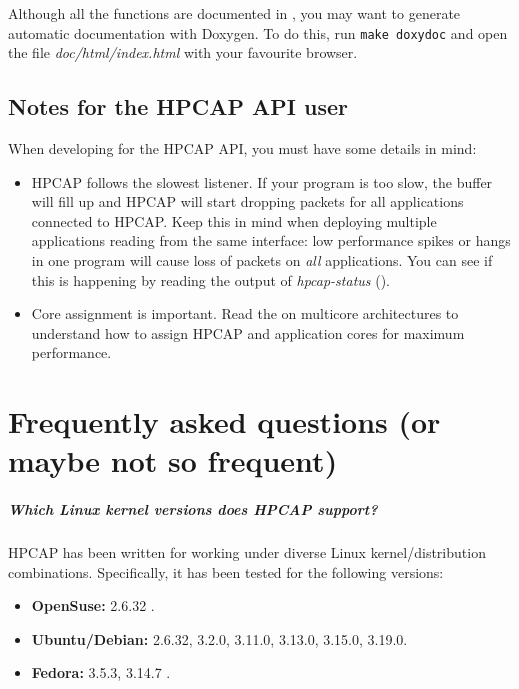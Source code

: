\documentclass[a4paper,oneside]{hpman}
\begin{document}
Although all the functions are documented in , you may want to generate automatic documentation with Doxygen. To do this, run \texttt{make doxydoc} and open the file \textit{doc/html/index.html} with your favourite browser.

\section{Notes for the HPCAP API user}

When developing for the HPCAP API, you must have some details in mind:

\begin{itemize}
\item HPCAP follows the slowest listener. If your program is too slow, the buffer will fill up and HPCAP will start dropping packets for all applications connected to HPCAP. Keep this in mind when deploying multiple applications reading from the same interface: low performance spikes or hangs in one program will cause loss of packets on \textit{all} applications. You can see if this is happening by reading the output of \textit{hpcap-status} ().
\item Core assignment is important. Read the  on multicore architectures to understand how to assign HPCAP and application cores for maximum performance.
\end{itemize}

\chapter{Frequently asked questions (or maybe not so frequent)}
\label{sec:FAQ}

\paragraph{Which Linux kernel versions does HPCAP support?}
    HPCAP has been written for working under diverse Linux kernel/distribution combinations. Specifically, it has been tested for the following versions:
    \begin{itemize}
        \item \textbf{OpenSuse:}  2.6.32 .
        \item \textbf{Ubuntu/Debian:} 2.6.32, 3.2.0, 3.11.0, 3.13.0, 3.15.0, 3.19.0.
        \item \textbf{Fedora:} 3.5.3, 3.14.7 .
    \end{itemize}
\end{document}
